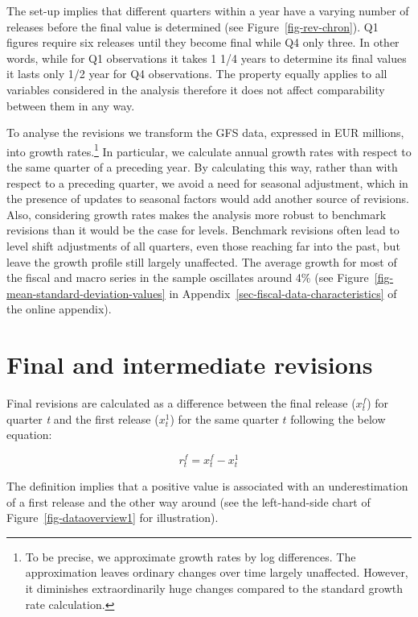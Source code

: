 \documentclass[
  letterpaper,
  authoryear,
  preprint,
  3p]{elsarticle}
\begin{document}
The set-up implies that different quarters within a year have a varying
number of releases before the final value is determined (see
Figure~\ref{fig-rev-chron}). Q1 figures require six releases until they
become final while Q4 only three. In other words, while for Q1
observations it takes 1 1/4 years to determine its final values it lasts
only 1/2 year for Q4 observations. The property equally applies to all
variables considered in the analysis therefore it does not affect
comparability between them in any way.

To analyse the revisions we transform the GFS data, expressed in EUR
millions, into growth rates.\footnote{To be precise, we approximate
  growth rates by log differences. The approximation leaves ordinary
  changes over time largely unaffected. However, it diminishes
  extraordinarily huge changes compared to the standard growth rate
  calculation.} In particular, we calculate annual growth rates with
respect to the same quarter of a preceding year. By calculating this
way, rather than with respect to a preceding quarter, we avoid a need
for seasonal adjustment, which in the presence of updates to seasonal
factors would add another source of revisions. Also, considering growth
rates makes the analysis more robust to benchmark revisions than it
would be the case for levels. Benchmark revisions often lead to level
shift adjustments of all quarters, even those reaching far into the
past, but leave the growth profile still largely unaffected. The average
growth for most of the fiscal and macro series in the sample oscillates
around 4\% (see Figure~\ref{fig-mean-standard-deviation-values} in
Appendix~\ref{sec-fiscal-data-characteristics} of the online appendix).

\hypertarget{sec-final_intermediate_revisions}{%
\section{Final and intermediate
revisions}\label{sec-final_intermediate_revisions}}

Final revisions are calculated as a difference between the final release
(\(x_{t}^{f}\)) for quarter \emph{t} and the first release
(\(x_{t}^{1}\)) for the same quarter \(t\) following the below equation:

\[
r_{t}^{f}=x_{t}^{f}-x_{t}^{1}
\]

The definition implies that a positive value is associated with an
underestimation of a first release and the other way around (see the
left-hand-side chart of Figure~\ref{fig-dataoverview1} for
illustration).
\end{document}
